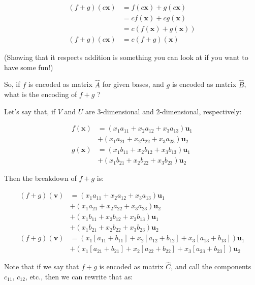 \documentclass[]{article}
\begin{document}
\[
\begin{aligned}
(f + g)(c \mathbf{x}) & = f(c \mathbf{x}) + g(c \mathbf{x}) \\
                      & = c f(\mathbf{x}) + c g(\mathbf{x}) \\
                      & = c ( f(\mathbf{x}) + g(\mathbf{x}) ) \\
(f + g)(c \mathbf{x}) & = c (f + g)(\mathbf{x})
\end{aligned}
\]

(Showing that it respects addition is something you can look at if you want to
have some fun!)

So, if \(f\) is encoded as matrix \(\hat{A}\) for given bases, and \(g\) is
encoded as matrix \(\hat{B}\), what is the encoding of \(f + g\) ?

Let's say that, if \(V\) and \(U\) are 3-dimensional and 2-dimensional,
respectively:

\[
\begin{aligned}
f(\mathbf{x}) & = (x_1 a_{11} + x_2 a_{12} + x_3 a_{13}) \mathbf{u}_1 \\
              & + (x_1 a_{21} + x_2 a_{22} + x_3 a_{23}) \mathbf{u}_2 \\
g(\mathbf{x}) & = (x_1 b_{11} + x_2 b_{12} + x_3 b_{13}) \mathbf{u}_1 \\
              & + (x_1 b_{21} + x_2 b_{22} + x_3 b_{23}) \mathbf{u}_2
\end{aligned}
\]

Then the breakdown of \(f + g\) is:

\[
\begin{aligned}
(f + g)(\mathbf{v}) & = (x_1 a_{11} + x_2 a_{12} + x_3 a_{13}) \mathbf{u}_1 \\
                    & + (x_1 a_{21} + x_2 a_{22} + x_3 a_{23}) \mathbf{u}_2 \\
                    & + (x_1 b_{11} + x_2 b_{12} + x_3 b_{13}) \mathbf{u}_1 \\
                    & + (x_1 b_{21} + x_2 b_{22} + x_3 b_{23}) \mathbf{u}_2 \\
(f + g)(\mathbf{v}) & = (x_1 [a_{11} + b_{11}] + x_2 [a_{12} + b_{12}] + x_3 [a_{13} + b_{13}]) \mathbf{u}_1 \\
                    & + (x_1 [a_{21} + b_{21}] + x_2 [a_{22} + b_{22}] + x_3 [a_{23} + b_{23}]) \mathbf{u}_2
\end{aligned}
\]

Note that if we say that \(f + g\) is encoded as matrix \(\hat{C}\), and call
the components \(c_{11}\), \(c_{12}\), etc., then we can rewrite that as:
\end{document}
